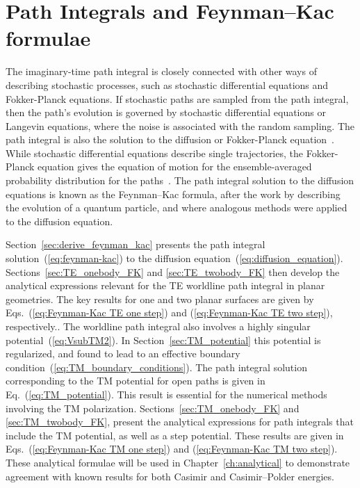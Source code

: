 \chapter{Path Integrals and Feynman--Kac formulae}

\label{ch:feynman_kac}

The imaginary-time path integral is closely connected with other ways of describing stochastic processes, 
such as stochastic differential equations and Fokker-Planck equations.
If stochastic paths are sampled from the path integral, then the path's evolution is governed by stochastic
differential equations or Langevin equations, where the noise is associated with the random sampling.
The path integral is also the solution to the diffusion or Fokker-Planck equation~\citep{Karatzas1991, Durrett1996}.
While stochastic differential equations describe single trajectories, the Fokker-Planck equation gives
the equation of motion for the ensemble-averaged probability distribution for the paths~\citep{Gardiner2009}.
The path integral solution to the diffusion equations is known as the Feynman--Kac formula,
after the work by \citet{Feynman1948} describing the evolution of a quantum particle, and \citet{Kac1949}
 where analogous methods were applied to the diffusion equation.

Section~\ref{sec:derive_feynman_kac} presents the path integral solution~(\ref{eq:feynman-kac}) 
to the diffusion equation~(\ref{eq:diffusion_equation}).
Sections~\ref{sec:TE_onebody_FK} and \ref{sec:TE_twobody_FK} then develop the analytical expressions relevant for the TE
worldline path integral in planar geometries.  The key results for one and two planar surfaces are given by  Eqs.~(\ref{eq:Feynman-Kac TE one step}) and
(\ref{eq:Feynman-Kac TE two step}), respectively..
The worldline path integral also involves a highly singular potential~(\ref{eq:VsubTM2}). In Section~\ref{sec:TM_potential}
this potential is regularized, and found to lead to an effective boundary condition~(\ref{eq:TM_boundary_conditions}).
The path integral solution corresponding to the TM potential for open paths is given in Eq.~(\ref{eq:TM_potential}).
This result is essential for the numerical methods involving the TM polarization.  
Sections~\ref{sec:TM_onebody_FK} and \ref{sec:TM_twobody_FK}, 
present the analytical expressions for path integrals that include the TM potential, as well as a step potential.
These results are given in Eqs.~(\ref{eq:Feynman-Kac TM one step})
and (\ref{eq:Feynman-Kac TM two step}).
These analytical formulae will be used in Chapter~\ref{ch:analytical} to demonstrate agreement 
with known results for both Casimir and Casimir--Polder energies.

